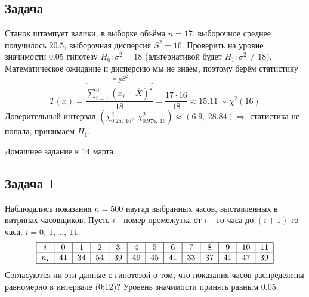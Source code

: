 \documentclass[12pt, a4paper]{article}
\begin{document}
\subsection*{Задача}
Станок штампует валики, в выборке объёма $n = 17$, выборочное среднее получилось $20.5$, выборочная дисперсия $S^2 = 16$. Проверить на уровне значимости 0.05 гипотезу $H_0: \sigma^2 = 18$ (альтернативой будет $H_1: \sigma^2 \neq 18$).\\
Математическое ожидание и дисперсию мы не знаем, поэтому берём статистику
\[T(x) = \frac{\overset{=nS^2}{\overbrace{\sum_{i = 1}^{n}\left( x_i - \overline{X} \right)^2}}}{18} = \frac{17\cdot 16}{18}\approx 15.11 \sim \chi^2(16)\]
Доверительный интервал $(\chi^2_{0.25,\ 16},\ \chi^2_{0.975,\ 16}) \approx (6.9,\ 28.84)\Rightarrow$ статистика не попала, принимаем $H_1$.
\begin{center}
    Домашнее задание к 14 марта.
\end{center}
\subsection*{Задача 1}
Наблюдались показания $n = 500$ наугад выбранных часов, выставленных в витринах  часовщиков. Пусть $i$ - номер промежутка от $i$ – го часа до $(i+1)$-го часа, $i = 0,\ 1,\dots,\ 11$.
\[\begin{tabular}{|c|c|c|c|c|c|c|c|c|c|c|c|c|}
        \hline
        $i$   & 0  & 1  & 2  & 3  & 4  & 5  & 6  & 7  & 8  & 9  & 10 & 11 \\
        \hline
        $n_i$ & 41 & 34 & 54 & 39 & 49 & 45 & 41 & 33 & 37 & 41 & 47 & 39 \\
        \hline
    \end{tabular}\]
Согласуются ли эти данные с гипотезой о том, что показания часов распределены равномерно в интервале (0;12)? Уровень значимости принять равным 0.05.
\end{document}

